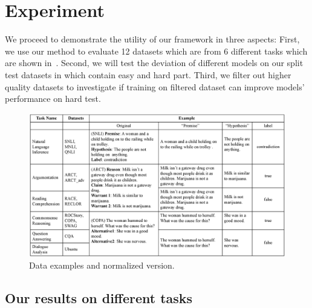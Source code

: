 \section{Experiment}
\label{sec:experiment}

We proceed to demonstrate the utility of our framework in three aspects:
 First, we use our method to evaluate 12 datasets which are from 6 different tasks 
 which are shown in~. 
 Second, we will test the deviation of different models on our split test datasets 
 in which contain easy and hard part. 
 Third, we filter out higher quality datasets to investigate if training on filtered dataset can 
 improve models' performance on hard test.
 

\begin{figure}[h]
\centering
\includegraphics[width=2\columnwidth]{picture/datasets_exp.eps}
\caption{Data examples and normalized version.}
\label{fig:datasets_exp}
\end{figure}

 \subsection{Our results on different tasks}
 \label{sec:experiment1}
 
